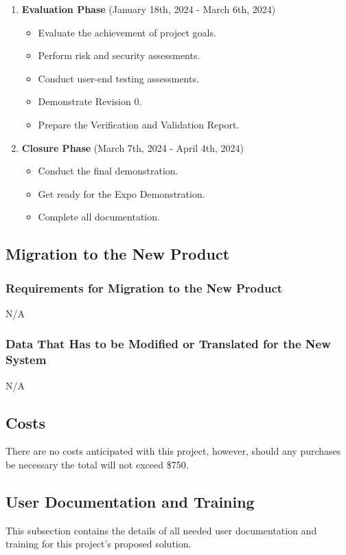 \documentclass[12pt]{article}
\begin{document}
\begin{enumerate}
      \item \textbf{Evaluation Phase} (January 18th, 2024 - March 6th, 2024)
      \begin{itemize}
        \item Evaluate the achievement of project goals.
        \item Perform risk and security assessments.
        \item Conduct user-end testing assessments.
        \item Demonstrate Revision 0.
        \item Prepare the Verification and Validation Report.
      \end{itemize}
    
      \item \textbf{Closure Phase} (March 7th, 2024 - April 4th, 2024)
      \begin{itemize}
        \item Conduct the final demonstration.
        \item Get ready for the Expo Demonstration.
        \item Complete all documentation.
      \end{itemize}
    \end{enumerate}

\subsection{Migration to the New Product}

\subsubsection{Requirements for Migration to the New Product}
N/A
\subsubsection{Data That Has to be Modified or Translated for the New System}
N/A

\subsection{Costs}
There are no costs anticipated with this project, however, should any purchases be necessary the total will not exceed \$750.

\subsection{User Documentation and Training}
This subsection contains the details of all needed user documentation and training for this project's proposed solution.
\end{document}
